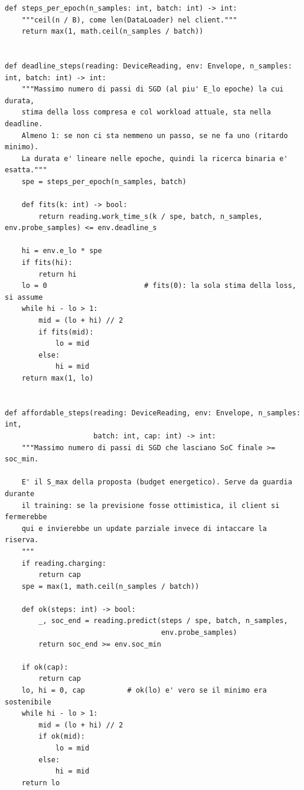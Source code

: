 \documentclass[11pt,a4paper]{article}
\begin{document}
\begin{lstlisting}[style=py,firstnumber=229,caption={\texttt{tesifl/tesiFL/client\_policy.py}, lines 229--283}]
def steps_per_epoch(n_samples: int, batch: int) -> int:
    """ceil(n / B), come len(DataLoader) nel client."""
    return max(1, math.ceil(n_samples / batch))


def deadline_steps(reading: DeviceReading, env: Envelope, n_samples: int, batch: int) -> int:
    """Massimo numero di passi di SGD (al piu' E_lo epoche) la cui durata,
    stima della loss compresa e col workload attuale, sta nella deadline.
    Almeno 1: se non ci sta nemmeno un passo, se ne fa uno (ritardo minimo).
    La durata e' lineare nelle epoche, quindi la ricerca binaria e' esatta."""
    spe = steps_per_epoch(n_samples, batch)

    def fits(k: int) -> bool:
        return reading.work_time_s(k / spe, batch, n_samples, env.probe_samples) <= env.deadline_s

    hi = env.e_lo * spe
    if fits(hi):
        return hi
    lo = 0                       # fits(0): la sola stima della loss, si assume
    while hi - lo > 1:
        mid = (lo + hi) // 2
        if fits(mid):
            lo = mid
        else:
            hi = mid
    return max(1, lo)


def affordable_steps(reading: DeviceReading, env: Envelope, n_samples: int,
                     batch: int, cap: int) -> int:
    """Massimo numero di passi di SGD che lasciano SoC finale >= soc_min.

    E' il S_max della proposta (budget energetico). Serve da guardia durante
    il training: se la previsione fosse ottimistica, il client si fermerebbe
    qui e invierebbe un update parziale invece di intaccare la riserva.
    """
    if reading.charging:
        return cap
    spe = max(1, math.ceil(n_samples / batch))

    def ok(steps: int) -> bool:
        _, soc_end = reading.predict(steps / spe, batch, n_samples,
                                     env.probe_samples)
        return soc_end >= env.soc_min

    if ok(cap):
        return cap
    lo, hi = 0, cap          # ok(lo) e' vero se il minimo era sostenibile
    while hi - lo > 1:
        mid = (lo + hi) // 2
        if ok(mid):
            lo = mid
        else:
            hi = mid
    return lo
\end{lstlisting}
\end{document}

